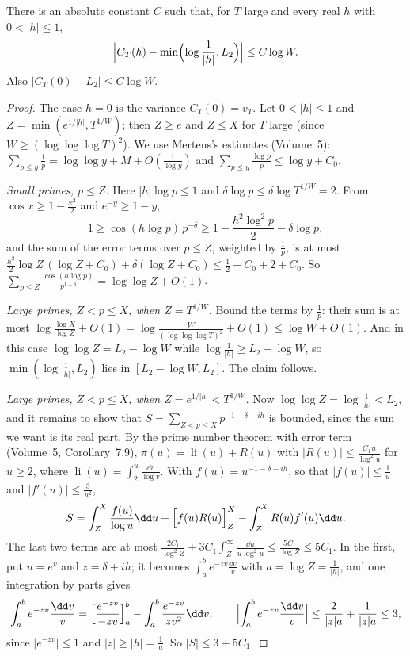 \begin{lemma}\label{lem:covariance}
There is an absolute constant $C$ such that, for $T$ large and every real $h$ with $0<|h|\le1$,
\[
\Bigl|C_T(h)-\min\Bigl(\log\frac1{|h|},L_2\Bigr)\Bigr|\le C\log W .
\]
Also $|C_T(0)-L_2|\le C\log W$.
\end{lemma}

\begin{proof}
The case $h=0$ is the variance $C_T(0)=v_T$. Let $0<|h|\le1$ and $Z=\min(e^{1/|h|},T^{1/W})$; then $Z\ge e$ and $Z\le X$ for $T$ large (since $W\ge(\log\log\log T)^2$). We use Mertens's estimates (Volume~5): $\sum_{p\le y}\frac1p=\log\log y+M+O(\frac1{\log y})$ and $\sum_{p\le y}\frac{\log p}p\le\log y+C_0$.

\emph{Small primes, $p\le Z$.} Here $|h|\log p\le1$ and $\delta\log p\le\delta\log T^{1/W}=2$. From $\cos x\ge1-\frac{x^2}2$ and $e^{-y}\ge1-y$,
\[
1\ge\cos(h\log p)\,p^{-\delta}\ge1-\frac{h^2\log^2p}2-\delta\log p,
\]
and the sum of the error terms over $p\le Z$, weighted by $\frac1p$, is at most $\frac{h^2}2\log Z\,(\log Z+C_0)+\delta(\log Z+C_0)\le\frac12+C_0+2+C_0$. So $\sum_{p\le Z}\frac{\cos(h\log p)}{p^{1+\delta}}=\log\log Z+O(1)$.

\emph{Large primes, $Z<p\le X$, when $Z=T^{1/W}$.} Bound the terms by $\frac1p$: their sum is at most $\log\frac{\log X}{\log Z}+O(1)=\log\frac W{(\log\log\log T)^2}+O(1)\le\log W+O(1)$. And in this case $\log\log Z=L_2-\log W$ while $\log\frac1{|h|}\ge L_2-\log W$, so $\min(\log\frac1{|h|},L_2)$ lies in $[L_2-\log W,L_2]$. The claim follows.

\emph{Large primes, $Z<p\le X$, when $Z=e^{1/|h|}<T^{1/W}$.} Now $\log\log Z=\log\frac1{|h|}<L_2$, and it remains to show that $S=\sum_{Z<p\le X}p^{-1-\delta-ih}$ is bounded, since the sum we want is its real part. By the prime number theorem with error term (Volume~5, Corollary~7.9), $\pi(u)=\operatorname{li}(u)+R(u)$ with $|R(u)|\le\frac{C_1u}{\log^2u}$ for $u\ge2$, where $\operatorname{li}(u)=\int_2^u\frac{\dd v}{\log v}$. With $f(u)=u^{-1-\delta-ih}$, so that $|f(u)|\le\frac1u$ and $|f'(u)|\le\frac3{u^2}$,
\[
S=\int_Z^X\frac{f(u)}{\log u}\dd u+\Bigl[f(u)R(u)\Bigr]_Z^X-\int_Z^XR(u)f'(u)\dd u .
\]
The last two terms are at most $\frac{2C_1}{\log^2Z}+3C_1\int_Z^\infty\frac{\dd u}{u\log^2u}\le\frac{5C_1}{\log Z}\le5C_1$. In the first, put $u=e^v$ and $z=\delta+ih$; it becomes $\int_a^be^{-zv}\frac{\dd v}v$ with $a=\log Z=\frac1{|h|}$, and one integration by parts gives
\[
\int_a^be^{-zv}\frac{\dd v}v=\Bigl[\frac{e^{-zv}}{-zv}\Bigr]_a^b-\int_a^b\frac{e^{-zv}}{zv^2}\dd v,\qquad\Bigl|\int_a^be^{-zv}\frac{\dd v}v\Bigr|\le\frac2{|z|a}+\frac1{|z|a}\le3,
\]
since $|e^{-zv}|\le1$ and $|z|\ge|h|=\frac1a$. So $|S|\le3+5C_1$.
\end{proof}

